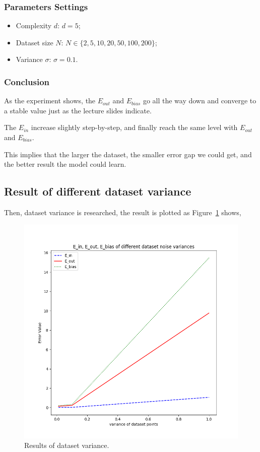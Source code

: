 \documentclass{article}
\begin{document}
\subsubsection{Parameters Settings}
\begin{itemize}
    \item Complexity $d$: $d = 5$;
    \item Dataset size $N$: $N \in \{ 2,5,10,20,50,100,200 \}$;
    \item Variance $\sigma$: $\sigma = 0.1$.
\end{itemize}

\subsubsection{Conclusion}

As the experiment shows, the $E_{out}$ and $E_{bias}$ go all the way down and converge to a stable value just as the lecture slides indicate.

The $E_{in}$ increase slightly step-by-step, and finally reach the same level with $E_{out}$ and $E_{bias}$.

This implies that the larger the dataset, the smaller error gap we could get, and the better result the model could learn.

\subsection{Result of different dataset variance}

Then, dataset variance is researched, the result is plotted as Figure~\ref{fig:variance_nonreg} shows,
\begin{figure}[h]
\centering
\includegraphics[width=.5\linewidth]{test_sigma_noreg.png}
\caption{\small Results of dataset variance.}
\label{fig:variance_nonreg}
\end{figure}
\end{document}
